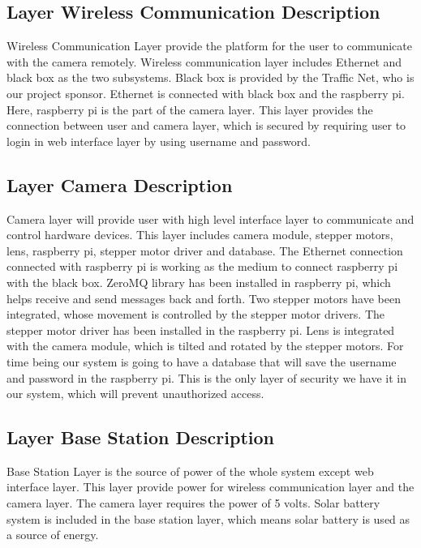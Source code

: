 \subsection{Layer Wireless Communication Description}
Wireless Communication Layer provide the platform for the user to communicate with the camera remotely. Wireless communication layer includes Ethernet and black box as the two subsystems. Black box is provided by the Traffic Net, who is our project sponsor. Ethernet is connected with black box and the raspberry pi. Here, raspberry pi is the part of the camera layer. This layer provides the connection between user and camera layer, which is secured by requiring user to login in web interface layer by using username and password.

\subsection{Layer Camera Description}
Camera layer will provide user with high level interface layer to communicate and control hardware devices. This layer includes camera module, stepper motors, lens, raspberry pi, stepper motor driver and database. The Ethernet connection connected with raspberry pi is working as the medium to connect raspberry pi with the black box. ZeroMQ library has been installed in raspberry pi, which helps receive and send messages back and forth. Two stepper motors have been integrated, whose movement is controlled by the stepper motor drivers. The stepper motor driver has been installed in the raspberry pi. Lens is integrated with the camera module, which is tilted and rotated by the stepper motors. For time being our system is going to have a database that will save the username and password in the raspberry pi. This is the only layer of security we have it in our system, which will prevent unauthorized access.

\subsection{Layer Base Station Description}
Base Station Layer is the source of power of the whole system except web interface layer. This layer provide power for wireless communication layer and the camera layer. The camera layer requires the power of 5 volts. Solar battery system is included in the base station layer, which means solar battery is used as a source of energy.





